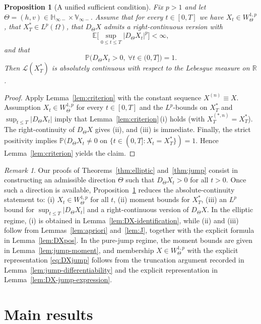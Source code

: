 \documentclass[11pt]{article}
\newcommand{\R}{\mathbb{R}}
\newcommand{\E}{\mathbb{E}}
\newcommand{\Pbb}{\mathbb{P}}
\newcommand{\Hb}{\mathbb{H}}
\newcommand{\Vb}{\mathbb{V}}
\newcommand{\1}{\mathbf{1}}
\newcommand{\law}{\mathcal{L}}
\newcommand{\Xstar}{X^{\ast}}
\newcommand{\Xstarn}{X^{(\ast,n)}}
\theoremstyle{plain}
\newtheorem{proposition}[theorem]{Proposition}
\theoremstyle{definition}
\theoremstyle{remark}
\newtheorem{remark}[theorem]{Remark}
\begin{document}
\begin{proposition}[A unified sufficient condition]\label{prop:unified}
Fix $p>1$ and let $\Theta=(h,v)\in \Hb_{\infty-}\times \Vb_{\infty-}$.
Assume that for every $t\in[0,T]$ we have $X_t\in W^{1,p}_\Theta$, that $\Xstar_T\in L^p(\Omega)$, that $D_\Theta X$ admits a right-continuous version with
\[
\E\Big[\sup_{0\le t\le T}|D_\Theta X_t|^p\Big]<\infty,
\]
and that
\[
\Pbb\big(D_\Theta X_t>0,\ \forall t\in(0,T]\big)=1.
\]
Then $\law(\Xstar_T)$ is absolutely continuous with respect to the Lebesgue measure on $\R$.
\end{proposition}

\begin{proof}
Apply Lemma~\ref{lem:criterion} with the constant sequence $X^{(n)}\equiv X$.
Assumption $X_t\in W^{1,p}_\Theta$ for every $t\in[0,T]$ and the $L^p$-bounds on $\Xstar_T$ and $\sup_{t\le T}|D_\Theta X_t|$
imply that Lemma~\ref{lem:criterion}\,\textup{(i)} holds (with $\Xstarn_T=\Xstar_T$).
The right-continuity of $D_\Theta X$ gives \textup{(ii)}, and \textup{(iii)} is immediate.
Finally, the strict positivity implies
$\Pbb(D_\Theta X_t\neq 0\text{ on }\{t\in(0,T]:X_t=\Xstar_T\})=1$.
Hence Lemma~\ref{lem:criterion} yields the claim.
\end{proof}

\begin{remark}
Our proofs of Theorems~\ref{thm:elliptic} and~\ref{thm:jump} consist in constructing an admissible direction $\Theta$
such that $D_\Theta X_t>0$ for all $t>0$.
Once such a direction is available, Proposition~\ref{prop:unified} reduces the absolute-continuity statement to:
(i) $X_t\in W^{1,p}_\Theta$ for all $t$,
(ii) moment bounds for $\Xstar_T$,
(iii) an $L^p$ bound for $\sup_{t\le T}|D_\Theta X_t|$ and a right-continuous version of $D_\Theta X$.
In the elliptic regime, \textup{(i)} is obtained in Lemma~\ref{lem:DX-identification}, while \textup{(ii)} and \textup{(iii)} follow from Lemmas~\ref{lem:apriori} and~\ref{lem:J}, together with the explicit formula in Lemma~\ref{lem:DXpos}.
In the pure-jump regime, the moment bounds are given in Lemma~\ref{lem:jump-moment}, and membership $X\in W^{1,p}_\Theta$ with the explicit representation \eqref{eq:DXjump}
follows from the truncation argument recorded in Lemma~\ref{lem:jump-differentiability} and the explicit representation in Lemma~\ref{lem:DX-jump-expression}.
\end{remark}

\section{Main results}\label{sec:main}
\end{document}
